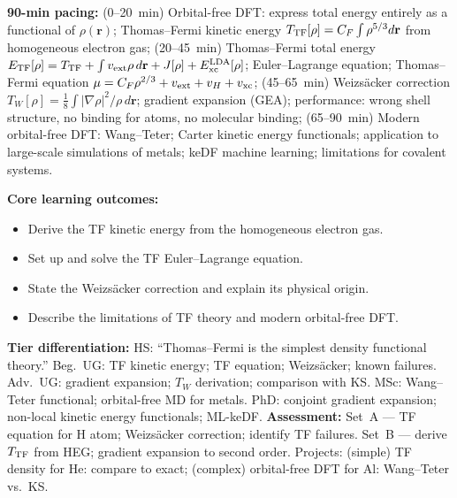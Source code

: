 \documentclass[11pt,a4paper]{article}
\begin{document}
\medskip

\begin{tcolorbox}[chembox, title={Module~III.3 --- Lecture L02: Thomas--Fermi--Weizs\"acker Theory}]
\textbf{90-min pacing:} (0--20~min) Orbital-free DFT: express total energy entirely as a functional of $\rho(\mathbf{r})$; Thomas--Fermi kinetic energy $T_{\rm TF}[\rho]=C_F\int\rho^{5/3}d\mathbf{r}$ from homogeneous electron gas; (20--45~min) Thomas--Fermi total energy $E_{\rm TF}[\rho]=T_{\rm TF}+\int v_{\rm ext}\rho\,d\mathbf{r}+J[\rho]+E_{\rm xc}^{\rm LDA}[\rho]$; Euler--Lagrange equation; Thomas--Fermi equation $\mu=C_F\rho^{2/3}+v_{\rm ext}+v_H+v_{\rm xc}$; (45--65~min) Weizs\"acker correction $T_W[\rho]=\tfrac{1}{8}\int|\nabla\rho|^2/\rho\,d\mathbf{r}$; gradient expansion (GEA); performance: wrong shell structure, no binding for atoms, no molecular binding; (65--90~min) Modern orbital-free DFT: Wang--Teter; Carter kinetic energy functionals; application to large-scale simulations of metals; keDF machine learning; limitations for covalent systems.

\medskip\textbf{Core learning outcomes:}
\begin{itemize}[leftmargin=1.4em,topsep=2pt,itemsep=1pt]
  \item Derive the TF kinetic energy from the homogeneous electron gas.
  \item Set up and solve the TF Euler--Lagrange equation.
  \item State the Weizs\"acker correction and explain its physical origin.
  \item Describe the limitations of TF theory and modern orbital-free DFT.
\end{itemize}
\medskip\textbf{Tier differentiation:}
HS: ``Thomas--Fermi is the simplest density functional theory.''
Beg.\ UG: TF kinetic energy; TF equation; Weizs\"acker; known failures.
Adv.\ UG: gradient expansion; $T_W$ derivation; comparison with KS.
MSc: Wang--Teter functional; orbital-free MD for metals.
PhD: conjoint gradient expansion; non-local kinetic energy functionals; ML-keDF.
\medskip\textbf{Assessment:}
Set~A --- TF equation for H atom; Weizs\"acker correction; identify TF failures.
Set~B --- derive $T_{\rm TF}$ from HEG; gradient expansion to second order.
Projects: (simple) TF density for He: compare to exact; (complex) orbital-free DFT for Al: Wang--Teter vs.\ KS.
\end{tcolorbox}

\medskip
\end{document}
